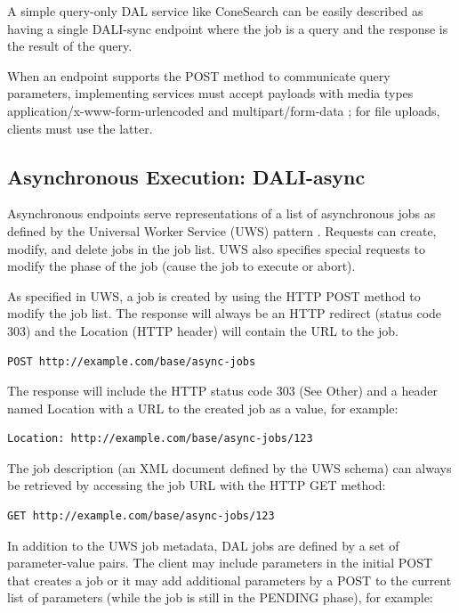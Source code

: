 \documentclass[11pt,letter]{ivoa}
\begin{document}
A simple query-only DAL service like ConeSearch can be easily described as
having a single DALI-sync endpoint where the job is a query and the response is
the result of the query.

When an endpoint supports the POST method to communicate query
parameters, implementing services must accept payloads with media types
application/x-www-form-urlencoded \citep{std:RFC1866} and
multipart/form-data \citep{std:RFC7578}; for file uploads, clients must
use the latter.

\subsection{Asynchronous Execution: DALI-async}
\label{sec:dali-async}
Asynchronous endpoints serve representations of a list of asynchronous jobs
as defined by the Universal Worker Service (UWS) pattern \citep{2016ivoa.spec.1024H}.
Requests can
create, modify, and delete jobs in the job list. UWS also specifies special
requests to modify the phase of the job (cause the job to execute or abort).

As specified in UWS, a job is created by using the HTTP POST method to modify
the job list. The response will always be an HTTP redirect (status code 303) and
the Location (HTTP header) will contain the URL to the job.

\begin{verbatim}
POST http://example.com/base/async-jobs
\end{verbatim}

The response will include the HTTP status code 303 (See Other) and a header
named Location with a URL to the created job as a value, for example:

\begin{verbatim}
Location: http://example.com/base/async-jobs/123
\end{verbatim}

The job description (an XML document defined by the UWS schema) can always be
retrieved by accessing the job URL with the HTTP GET method:

\begin{verbatim}
GET http://example.com/base/async-jobs/123
\end{verbatim}



In addition to the UWS job metadata, DAL jobs are defined by a set of
parameter-value pairs. The client may include parameters in the initial POST
that creates a job or it may add additional parameters by a POST to the current
list of parameters (while the job is still in the PENDING phase), for example:
\end{document}
